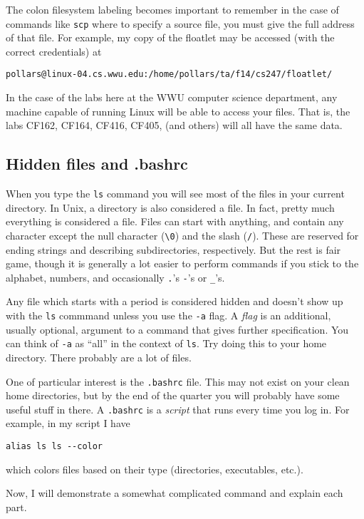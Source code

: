 \documentclass[12pt]{article}
\begin{document}
The colon filesystem labeling becomes important to remember in the case of commands like \verb|scp| where to specify a source file, you must give the full address of that file. For example, my copy of the floatlet may be accessed (with the correct credentials) at
\begin{verbatim}
pollars@linux-04.cs.wwu.edu:/home/pollars/ta/f14/cs247/floatlet/
\end{verbatim}

In the case of the labs here at the WWU computer science department, any machine capable of running Linux will be able to access your files. That is, the labs CF162, CF164, CF416, CF405, (and others) will all have the same data.

\subsection{Hidden files and .bashrc}
When you type the \verb|ls| command you will see most of the files in your current directory. In Unix, a directory is also considered a file. In fact, pretty much everything is considered a file. Files can start with anything, and contain any character except the null character (\verb|\0|) and the slash (\verb|/|). These are reserved for ending strings and describing subdirectories, respectively. But the rest is fair game, though it is generally a lot easier to perform commands if you stick to the alphabet, numbers, and occasionally \verb|.|'s \verb|-|'s or \verb|_|'s.

Any file which starts with a period is considered hidden and doesn't show up with the \verb|ls| commmand unless you use the \verb|-a| flag. A \emph{flag} is an additional, usually optional, argument to a command that gives further specification. You can think of \verb|-a| as ``all'' in the context of \verb|ls|. Try doing this to your home directory. There probably are a lot of files.

One of particular interest is the \verb|.bashrc| file. This may not exist on your clean home directories, but by the end of the quarter you will probably have some useful stuff in there. A \verb|.bashrc| is a \emph{script} that runs every time you log in. For example, in my script I have 
\begin{verbatim}
alias ls ls --color
\end{verbatim}
which colors files based on their type (directories, executables, etc.).

Now, I will demonstrate a somewhat complicated command and explain each part.
\end{document}
